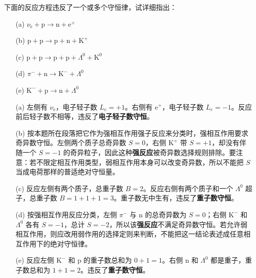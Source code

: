 \begin{exercise}\label{ex:30.6}
下面的反应方程违反了一个或多个守恒律，试详细指出：
\begin{enumerate}
  \item[(a)] $\nu_{\mathrm{e}} + \mathrm{p} \rightarrow \mathrm{n} + \mathrm{e}^+$
  \item[(b)] $\mathrm{p} + \mathrm{p} \rightarrow \mathrm{p} + \mathrm{n} + \mathrm{K}^+$
  \item[(c)] $\mathrm{p} + \mathrm{p} \rightarrow \mathrm{p} + \mathrm{p} + \Lambda^0 + \mathrm{K}^0$
  \item[(d)] $\pi^- + \mathrm{n} \rightarrow \mathrm{K}^- + \Lambda^0$
  \item[(e)] $\mathrm{K}^- + \mathrm{p} \rightarrow \mathrm{n} + \Lambda^0$
\end{enumerate}
\end{exercise}
\begin{solution}
\begin{enumerate}
    \item[(a)] 左侧有 $\nu_{\mathrm{e}}$，电子轻子数 $L_e = +1$。右侧有 $\mathrm{e}^+$，电子轻子数 $L_e = -1$。反应前后轻子数不相等，违反了\textbf{电子轻子数守恒}。
    \item[(b)] 按本题所在段落把它作为强相互作用强子反应来分类时，强相互作用要求奇异数守恒。左侧两个质子总奇异数 $S=0$，右侧 $\mathrm{K}^+$ 带 $S=+1$，却没有伴随一个 $S=-1$ 的奇异粒子，因此这种\textbf{强反应}被奇异数选择规则排除。要注意：若不限定相互作用类型，弱相互作用本身可以改变奇异数，所以不能把 $S$ 当成电荷那样的普适绝对守恒量。
    \item[(c)] 反应左侧有两个质子，总重子数 $B = 2$。反应右侧有两个质子和一个 $\Lambda^0$ 超子，总重子数 $B = 1 + 1 + 1 = 3$。重子数无中生有，违反了\textbf{重子数守恒}。
    \item[(d)] 按强相互作用反应分类，左侧 $\pi^-$ 与 $\mathrm n$ 的总奇异数为 $S=0$；右侧 $\mathrm K^-$ 和 $\Lambda^0$ 各有 $S=-1$，总计 $S=-2$，所以该\textbf{强反应}不满足奇异数守恒。若允许弱相互作用，则应改用弱作用的选择定则来判断，不能把这一结论表述成任意相互作用下的绝对守恒律。
    \item[(e)] 反应左侧 $\mathrm{K}^-$ 和 $\mathrm{p}$ 的重子数总和为 $0 + 1 = 1$。右侧 $\mathrm{n}$ 和 $\Lambda^0$ 都是重子，重子数总和为 $1 + 1 = 2$。违反了\textbf{重子数守恒}。
\end{enumerate}
\end{solution}

